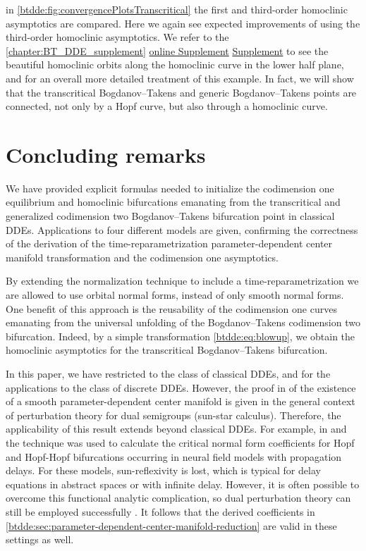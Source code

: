 in \cref{btdde:fig:convergencePlotsTranscritical} the first and third-order
homoclinic asymptotics are compared. Here we again see expected improvements of using the
third-order homoclinic asymptotics. We refer to the
\ifthesis%
    \cref{chapter:BT_DDE_supplement} %
\fi%
\ifsiam%
    \hyperref[mysupplement]{online Supplement} %
\fi%
\ifarxiv%
    \hyperlink{mysupplement}{Supplement} %
\fi to see the beautiful
homoclinic orbits along the homoclinic curve in the lower half plane, and for
an overall more detailed treatment of this example. In fact, we will show that
the transcritical Bogdanov--Takens and generic Bogdanov--Takens points are
connected, not only by a Hopf curve, but also through a homoclinic curve. 

\section{Concluding remarks}
We have provided explicit formulas needed to initialize the codimension one
equilibrium and homoclinic bifurcations emanating from the transcritical and
generalized codimension two Bogdanov--Takens bifurcation point in classical
DDEs. Applications to four different models are given, confirming the
correctness of the derivation of the time-reparametrization
parameter-dependent
center manifold transformation and the codimension one asymptotics.

By extending the normalization technique to include a time-reparametrization we
are allowed to use orbital normal forms, instead of only smooth normal forms.
One benefit of this approach is the reusability of the codimension one curves
emanating from the universal unfolding of the Bogdanov--Takens codimension two
bifurcation. Indeed, by a simple transformation \cref{btdde:eq:blowup}, we obtain the
homoclinic asymptotics for the transcritical Bogdanov--Takens bifurcation.

In this paper, we have restricted to the class of classical DDEs, and for the
applications to the class of discrete DDEs. However, the proof in
\cite{Switching2019} of the existence of a smooth parameter-dependent center
manifold is given in the general context of perturbation theory for dual
semigroups (sun-star calculus). Therefore, the applicability of this result
extends beyond classical DDEs. For example, in \cite{VanGils2013} and
\cite{Dijkstra2015} the technique was used to calculate the critical normal
form coefficients for Hopf and Hopf-Hopf bifurcations occurring in neural field
models with propagation delays. For these models, sun-reflexivity is lost, which
is typical for delay equations in abstract spaces or with infinite delay.
However, it is often possible to overcome this functional analytic
complication, so dual perturbation theory can still be employed successfully
\cite{Diekmann2008,Diekmann2012blending,VanGils2013,Janssens2019}. It follows
that the derived coefficients in
\cref{btdde:sec:parameter-dependent-center-manifold-reduction} are valid in these
settings as well.


